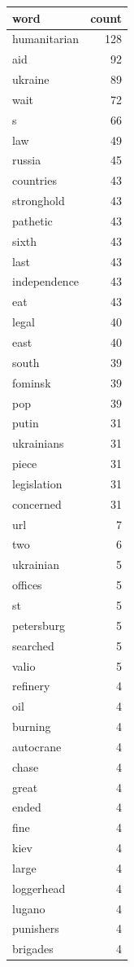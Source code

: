 \begin{tabular}{lr}
\toprule
word & count \\
\midrule
humanitarian & 128 \\
aid & 92 \\
ukraine & 89 \\
wait & 72 \\
s & 66 \\
law & 49 \\
russia & 45 \\
countries & 43 \\
stronghold & 43 \\
pathetic & 43 \\
sixth & 43 \\
last & 43 \\
independence & 43 \\
eat & 43 \\
legal & 40 \\
east & 40 \\
south & 39 \\
fominsk & 39 \\
pop & 39 \\
putin & 31 \\
ukrainians & 31 \\
piece & 31 \\
legislation & 31 \\
concerned & 31 \\
url & 7 \\
two & 6 \\
ukrainian & 5 \\
offices & 5 \\
st & 5 \\
petersburg & 5 \\
searched & 5 \\
valio & 5 \\
refinery & 4 \\
oil & 4 \\
burning & 4 \\
autocrane & 4 \\
chase & 4 \\
great & 4 \\
ended & 4 \\
fine & 4 \\
kiev & 4 \\
large & 4 \\
loggerhead & 4 \\
lugano & 4 \\
punishers & 4 \\
brigades & 4 \\

\end{tabular}
